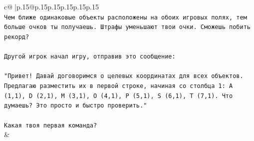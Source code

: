 \documentclass{article}
\begin{document}
{\begin{supertabular}{c@{$\;$}|p{.15\linewidth}@{}p{.15\linewidth}p{.15\linewidth}p{.15\linewidth}p{.15\linewidth}p{.15\linewidth}}
{{{\\ 
\texttt{Чем ближе одинаковые объекты расположены на обоих игровых полях, тем больше очков ты получаешь. Штрафы уменьшают твои очки. Сможешь побить рекорд?} \\
\\ 
\texttt{Другой игрок начал игру, отправив это сообщение:} \\
\\ 
\texttt{"Привет! Давай договоримся о целевых координатах для всех объектов. Предлагаю разместить их в первой строке, начиная со столбца 1: A (1,1), D (2,1), M (3,1), O (4,1), P (5,1), S (6,1), T (7,1). Что думаешь? Это просто и быстро проверить."} \\
\\ 
\texttt{Какая твоя первая команда?} \\
            }
        }
    }
    & \\ \\


\end{supertabular}}
\end{document}
